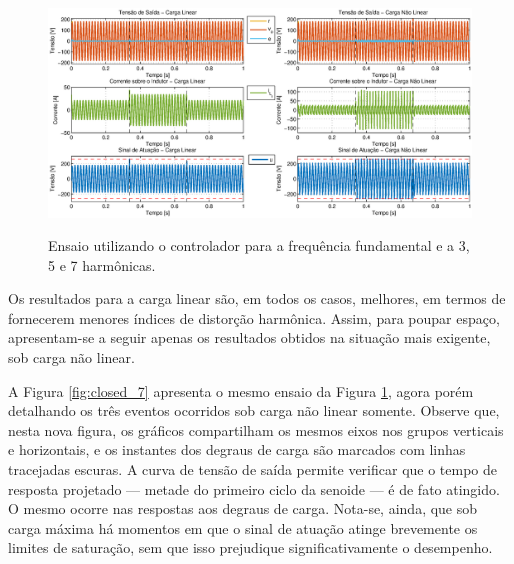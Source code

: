 \documentclass[repeatfields,oneside,overleaf]{tcc}
\begin{document}
\begin{figure}[h]
    \centering
    \caption{Ensaio utilizando o controlador para a frequência fundamental e a 3{\textordfeminine}, 5{\textordfeminine} e 7{\textordfeminine} harmônicas.}
    \includegraphics[trim={80 20 80 20}, clip, width=\linewidth]{fig/closed_7_full.eps}
    \\
    \label{fig:closed_7_full}
\end{figure}

Os resultados para a carga linear são, em todos os casos, melhores, em termos de fornecerem menores índices de distorção harmônica.
Assim, para poupar espaço, apresentam-se a seguir apenas os resultados obtidos na situação mais exigente, sob carga não linear.

A Figura \ref{fig:closed_7} apresenta o mesmo ensaio da Figura \ref{fig:closed_7_full}, agora porém detalhando os três eventos ocorridos sob carga não linear somente.
Observe que, nesta nova figura, os gráficos compartilham os mesmos eixos nos grupos verticais e horizontais, e os instantes dos degraus de carga são marcados com linhas tracejadas escuras.
A curva de tensão de saída permite verificar que o tempo de resposta projetado --- metade do primeiro ciclo da senoide --- é de fato atingido.
O mesmo ocorre nas respostas aos degraus de carga.
Nota-se, ainda, que sob carga máxima há momentos em que o sinal de atuação atinge brevemente os limites de saturação, sem que isso prejudique significativamente o desempenho.
\end{document}

